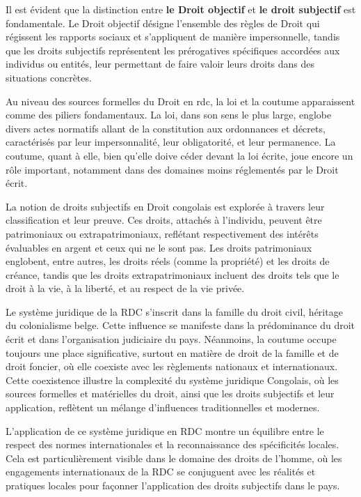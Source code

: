 Il est évident que la distinction entre \textbf{le Droit objectif} et \textbf{le droit subjectif} est fondamentale. Le Droit objectif désigne l'ensemble des règles de Droit qui régissent les rapports sociaux et s'appliquent de manière impersonnelle, tandis que les droits subjectifs représentent les prérogatives spécifiques accordées aux individus ou entités, leur permettant de faire valoir leurs droits dans des situations concrètes.

Au niveau des sources formelles du Droit en \ac{rdc}, la loi et la coutume apparaissent comme des piliers fondamentaux. La loi, dans son sens le plus large, englobe divers actes normatifs allant de la constitution aux ordonnances et décrets, caractérisés par leur impersonnalité, leur obligatorité, et leur permanence. La coutume, quant à elle, bien qu'elle doive céder devant la loi écrite, joue encore un rôle important, notamment dans des domaines moins réglementés par le Droit écrit.

La notion de droits subjectifs en Droit congolais est explorée à travers leur classification et leur preuve. Ces droits, attachés à l'individu, peuvent être patrimoniaux ou extrapatrimoniaux, reflétant respectivement des intérêts évaluables en argent et ceux qui ne le sont pas. Les droits patrimoniaux englobent, entre autres, les droits réels (comme la propriété) et les droits de créance, tandis que les droits extrapatrimoniaux incluent des droits tels que le droit à la vie, à la liberté, et au respect de la vie privée.

Le système juridique de la RDC s'inscrit dans la famille du droit civil, héritage du colonialisme belge. Cette influence se manifeste dans la prédominance du droit écrit et dans l'organisation judiciaire du pays. Néanmoins, la coutume occupe toujours une place significative, surtout en matière de droit de la famille et de droit foncier, où elle coexiste avec les règlements nationaux et internationaux. Cette coexistence illustre la complexité du système juridique Congolais, où les sources formelles et matérielles du droit, ainsi que les droits subjectifs et leur application, reflètent un mélange d'influences traditionnelles et modernes.

L'application de ce système juridique en RDC montre un équilibre entre le respect des normes internationales et la reconnaissance des spécificités locales. Cela est particulièrement visible dans le domaine des droits de l'homme, où les engagements internationaux de la RDC se conjuguent avec les réalités et pratiques locales pour façonner l'application des droits subjectifs dans le pays.


